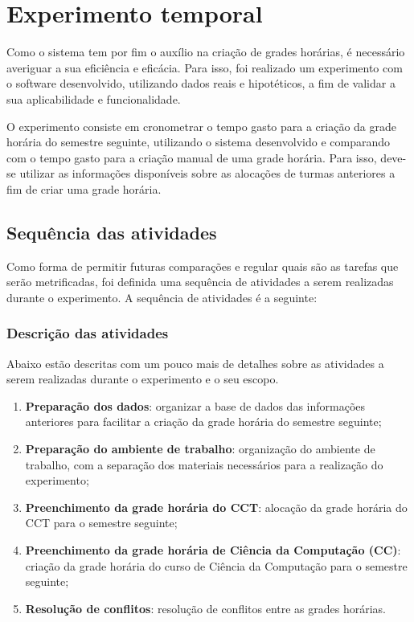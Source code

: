 \chapter{Experimento temporal} \label{chap:experimentos}

Como o sistema tem por fim o auxílio na criação de grades horárias, é necessário averiguar a sua eficiência e eficácia. Para isso, foi realizado um experimento com o software desenvolvido, utilizando dados reais e hipotéticos, a fim de validar a sua aplicabilidade e funcionalidade.

O experimento consiste em cronometrar o tempo gasto para a criação da grade horária do semestre seguinte, utilizando o sistema desenvolvido e comparando com o tempo gasto para a criação manual de uma grade horária. Para isso, deve-se utilizar as informações disponíveis sobre as alocações de turmas anteriores a fim de criar uma grade horária.

\section{Sequência das atividades}

Como forma de permitir futuras comparações e regular quais são as tarefas que serão metrificadas, foi definida uma sequência de atividades a serem realizadas durante o experimento. A sequência de atividades é a seguinte:

\subsection{Descrição das atividades}

Abaixo estão descritas com um pouco mais de detalhes sobre as atividades a serem realizadas durante o experimento e o seu escopo.

\begin{enumerate}
  \item \textbf{Preparação dos dados}: organizar a base de dados das informações anteriores para facilitar a criação da grade horária do semestre seguinte;
  \item \textbf{Preparação do ambiente de trabalho}: organização do ambiente de trabalho, com a separação dos materiais necessários para a realização do experimento;
  \item \textbf{Preenchimento da grade horária do CCT}: alocação da grade horária do CCT para o semestre seguinte;
  \item \textbf{Preenchimento da grade horária de Ciência da Computação (CC)}: criação da grade horária do curso de Ciência da Computação para o semestre seguinte;
  \item \textbf{Resolução de conflitos}: resolução de conflitos entre as grades horárias.
\end{enumerate}

